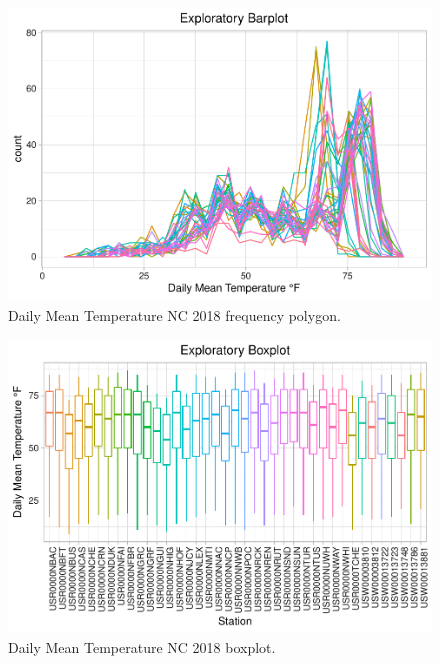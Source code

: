 \documentclass[12pt,]{article}
\begin{document}
\begin{figure}
\centering
\includegraphics{Raby_ENV872_Project_files/figure-latex/unnamed-chunk-30-1.pdf}
\caption{Daily Mean Temperature NC 2018 frequency polygon.
\label{Temp_freqpoly}}
\end{figure}

\begin{figure}
\centering
\includegraphics{Raby_ENV872_Project_files/figure-latex/unnamed-chunk-31-1.pdf}
\caption{Daily Mean Temperature NC 2018 boxplot. \label{Temp_boxplot}}
\end{figure}
\end{document}
